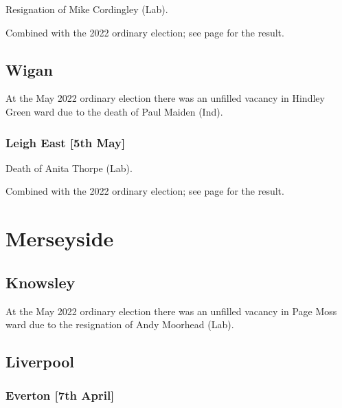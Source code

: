\documentclass[a4paper,openany]{book}
\begin{document}
\begin{resultsiii}

Resignation of Mike Cordingley (Lab).

Combined with the 2022 ordinary election; see page \pageref{TraffordGorseHill} for the result.

\subsection*{Wigan}

At the May 2022 ordinary election there was an unfilled vacancy in Hindley Green ward due to the death of Paul Maiden (Ind).%

\subsubsection*{Leigh East \hspace*{\fill}\nolinebreak[1]%
	\enspace\hspace*{\fill}
	[5th May]}


Death of Anita Thorpe (Lab).

Combined with the 2022 ordinary election; see page \pageref{WiganLeighEast} for the result.

\section{Merseyside}

\subsection*{Knowsley}

At the May 2022 ordinary election there was an unfilled vacancy in Page Moss ward due to the resignation of Andy Moorhead (Lab).%

\subsection*{Liverpool}

\subsubsection*{Everton \hspace*{\fill}\nolinebreak[1]%
	\enspace\hspace*{\fill}
	[7th April]}


\end{resultsiii}
\end{document}
